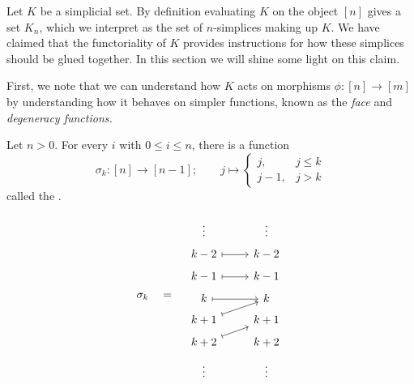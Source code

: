 \documentclass[main.tex]{subfiles}
\begin{document}
Let $K$ be a simplicial set. By definition evaluating $K$ on the object $[n]$ gives a set $K_{n}$, which we interpret as the set of $n$-simplices making up $K$. We have claimed that the functoriality of $K$ provides instructions for how these simplices should be glued together. In this section we will shine some light on this claim.

First, we note that we can understand how $K$ acts on morphisms $\phi\colon [n] \to [m]$ by understanding how it behaves on simpler functions, known as the \emph{face} and \emph{degeneracy functions.}

\begin{definition}
  \label{def:degeneracy_function_simplicial_category}
  Let $n > 0$. For every $i$ with $0 \leq i \leq n$, there is a function
  \begin{equation*}
    \sigma_{k}\colon [n] \to [n - 1];\qquad j \mapsto
    \begin{cases}
      j, & j \leq k \\
      j - 1, & j > k
    \end{cases}
  \end{equation*}
  called the .
\end{definition}
\begin{equation*}
  \sigma_{k} \quad = \quad
  \begin{tikzcd}[row sep=tiny]
    \vdots & \vdots
    \\
    k-2
    \arrow[r, mapsto]
    & k-2
    \\
    k-1
    \arrow[r, mapsto]
    & k-1
    \\
    k
    \arrow[r, mapsto]
    & k
    \\
    k+1
    \arrow[ur, mapsto]
    & k+1
    \\
    k+2
    \arrow[ur, mapsto]
    & k+2
    \\
    \vdots & \vdots
  \end{tikzcd}
\end{equation*}
\end{document}
